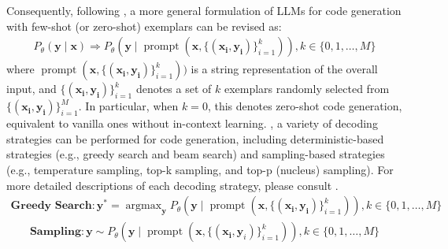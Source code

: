 Consequently, following \cite{ni2023lever}, a more general formulation of LLMs for code generation with few-shot (or zero-shot) exemplars can be revised as:
\begin{equation}
\begin{aligned}
   P_\theta(\mathbf{y}\mid\mathbf{x}) \Rightarrow P_\theta(\mathbf{y}\mid\operatorname{prompt}(\mathbf{x}, \{(\mathbf{x_i}, \mathbf{y_i})\}_{i=1}^k)), k\in\{0, 1, \dots, M\}
\end{aligned}
\end{equation}
where $\operatorname{prompt}(\mathbf{x}, \{(\mathbf{x_i}, \mathbf{y_i})\}_{i=1}^k))$ is a string representation of the overall input, and $\{(\mathbf{x_i}, \mathbf{y_i})\}_{i=1}^k$ denotes a set of $k$ exemplars randomly selected from $\{(\mathbf{x_i}, \mathbf{y_i})\}_{i=1}^M$. 
In particular, when $k=0$, this denotes zero-shot code generation, equivalent to vanilla ones without in-context learning.  
, a variety of decoding strategies can be performed for code generation, including deterministic-based strategies (e.g., greedy search and beam search) and sampling-based strategies (e.g., temperature sampling, top-k sampling, and top-p (nucleus) sampling). 
For more detailed descriptions of each decoding strategy, please consult \cite{holtzman2019curious}. 
\begin{equation}
\begin{aligned}
\textbf{Greedy Search}:
   \mathbf{y^*} = \mathop{\mathrm{argmax}}_\mathbf{y} P_\theta(\mathbf{y}\mid\operatorname{prompt}(\mathbf{x}, \{(\mathbf{x_i}, \mathbf{y_i})\}_{i=1}^k)), k\in\{0, 1, \dots, M\}
\end{aligned}
\end{equation}
\begin{equation}
\begin{aligned}
\textbf{Sampling}: 
   \mathbf{y} \sim P_\theta(\mathbf{y}\mid\operatorname{prompt}(\mathbf{x}, \{(\mathbf{x_i}, \mathbf{y}_i)\}_{i=1}^k)), k\in\{0, 1, \dots, M\}
\end{aligned}
\end{equation}

